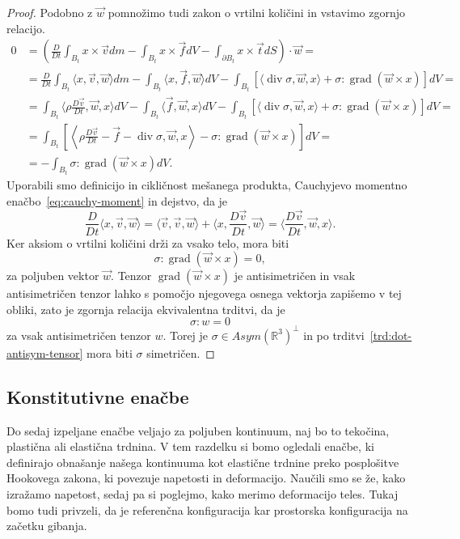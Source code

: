 \documentclass[12pt,a4paper,twoside]{article}
\theoremstyle{definition} %
\theoremstyle{plain} %
\numberwithin{equation}{section}
\newcommand{\R}{\mathbb R}
\renewcommand{\div}{\operatorname{div}}
\newcommand{\grad}{\operatorname{grad}}
\newcommand{\DD}[2]{\ensuremath{\frac{D #1}{D #2}}}
\newcommand{\DDt}[1]{\DD{#1}{t}}
\newcommand{\vv}{\vec{v}}
\newcommand{\vt}{\vec{t}}
\newcommand{\vw}{\vec{w}}
\newcommand{\vf}{\vec{f}}
\newcommand{\vx}{x}
\newcommand{\ts}{\sigma}
\begin{document}
\begin{proof}
Podobno z $\vw$ pomnožimo tudi zakon o vrtilni količini in vstavimo zgornjo
relacijo.
\begin{align*}
  0 &= \left(\DDt{}\int_{B_t}\vx \times \vv dm - \int_{B_t} \vx \times \vf dV -
  \int_{\partial B_t} \vx\times\vt dS\right)\cdot \vw = \\ &=
  \DDt{}\int_{B_t}\langle \vx, \vv, \vw\rangle  dm - \int_{B_t} \langle \vx,
  \vf, \vw\rangle dV - \int_{B_t} [\langle \div \ts, \vw, \vx\rangle +  \ts :
  \grad (\vw \times \vx)] dV = \\ &=
  \int_{B_t}\langle \rho \DDt\vv, \vw, \vx \rangle  dV - \int_{B_t} \langle \vf,
  \vw, \vx\rangle dV - \int_{B_t} [\langle \div \ts, \vw, \vx\rangle +  \ts :
  \grad (\vw \times \vx)] dV = \\ &=
\int_{B_t}\left[ \left\langle\rho \DDt\vv - \vf - \div \ts, \vw, \vx\right\rangle -  \ts : \grad
  (\vw \times \vx)\right] dV = \\ &=
- \int_{B_t} \ts : \grad (\vw \times \vx) dV.
\end{align*}
Uporabili smo definicijo in cikličnost mešanega produkta, Cauchyjevo momentno
enačbo~\eqref{eq:cauchy-moment} in dejstvo, da je
\[
  \DDt{}\langle \vx, \vv, \vw \rangle =
  \langle \vv, \vv, \vw \rangle +
  \langle \vx, \DDt\vv, \vw \rangle =
  \langle \DDt\vv, \vw, \vx \rangle.
\]
Ker aksiom o vrtilni količini drži za vsako telo, mora biti
\[
  \ts : \grad (\vw \times \vx) = 0,
\]
za poljuben vektor $\vw$. Tenzor $\grad (\vw \times \vx)$ je antisimetričen in
vsak antisimetričen tenzor lahko s pomočjo njegovega osnega vektorja zapišemo v
tej obliki, zato je zgornja relacija ekvivalentna trditvi, da je
\[ \ts : w = 0\] za vsak antisimetričen tenzor $w$.
Torej je $\ts \in Asym(\R^3)^\perp$ in po trditvi~\ref{trd:dot-antisym-tensor}
mora biti $\ts$ simetričen.
\end{proof}

\subsection{Konstitutivne enačbe}
Do sedaj izpeljane enačbe veljajo za poljuben kontinuum, naj bo to tekočina,
plastična ali elastična trdnina. V tem razdelku si bomo ogledali enačbe, ki
definirajo obnašanje našega kontinuuma kot elastične trdnine preko posplošitve
Hookovega zakona, ki povezuje napetosti in deformacijo. Naučili smo se že, kako
izražamo napetost, sedaj pa si poglejmo, kako merimo deformacijo teles.
Tukaj bomo tudi privzeli, da je referenčna konfiguracija kar prostorska
konfiguracija na začetku gibanja.
\end{document}
